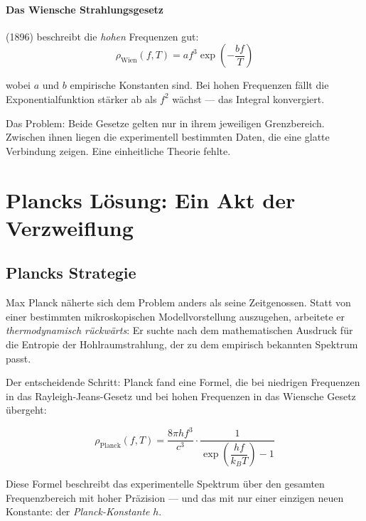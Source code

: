 \paragraph{Das Wiensche Strahlungsgesetz} (1896) beschreibt die \emph{hohen} Frequenzen 
gut:
\begin{equation}
    \rho_{\text{Wien}}(f, T) = af^3 \exp\!\left(-\frac{bf}{T}\right)
    \label{eq:wien_law}
\end{equation}

wobei $a$ und $b$ empirische Konstanten sind. Bei hohen Frequenzen fällt die 
Exponentialfunktion stärker ab als $f^2$ wächst — das Integral konvergiert.

Das Problem: Beide Gesetze gelten nur in ihrem jeweiligen Grenzbereich. Zwischen ihnen 
liegen die experimentell bestimmten Daten, die eine glatte Verbindung zeigen. Eine 
einheitliche Theorie fehlte.

\clearpage

\section{Plancks Lösung: Ein Akt der Verzweiflung}
\label{sec:planck}

\subsection{Plancks Strategie}

Max Planck näherte sich dem Problem anders als seine Zeitgenossen. Statt von einer 
bestimmten mikroskopischen Modellvorstellung auszugehen, arbeitete er 
\emph{thermodynamisch rückwärts}: Er suchte nach dem mathematischen Ausdruck für 
die Entropie der Hohlraumstrahlung, der zu dem empirisch bekannten Spektrum passt.

Der entscheidende Schritt: Planck fand eine Formel, die bei niedrigen Frequenzen 
in das Rayleigh-Jeans-Gesetz und bei hohen Frequenzen in das Wiensche Gesetz übergeht:

\begin{equation}
    \rho_{\text{Planck}}(f, T) = \frac{8\pi h f^3}{c^3} \cdot \frac{1}{\exp\!\left(\dfrac{hf}{k_BT}\right) - 1}
    \label{eq:planck_law}
\end{equation}

Diese Formel beschreibt das experimentelle Spektrum über den gesamten Frequenzbereich 
mit hoher Präzision — und das mit nur einer einzigen neuen Konstante: 
der \emph{Planck-Konstante} $h$.

